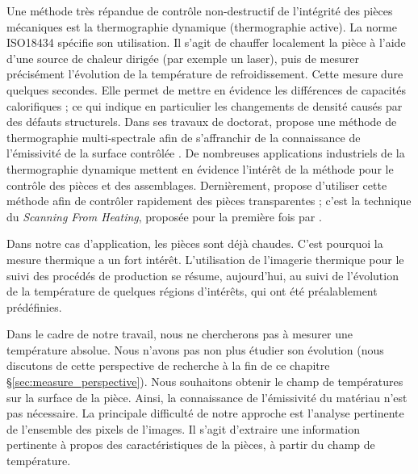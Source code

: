 Une méthode très répandue de contrôle non-destructif de l'intégrité des pièces mécaniques est la thermographie dynamique (thermographie active).
La norme ISO18434 \cite{iso_tc108_iso_2008} spécifie son utilisation.
Il s'agit de chauffer localement la pièce à l'aide d'une source de chaleur dirigée (par exemple un laser), puis de mesurer précisément l'évolution de la température de refroidissement.
Cette mesure dure quelques secondes.
Elle permet de mettre en évidence les différences de capacités calorifiques ; ce qui indique en particulier les changements de densité causés par des défauts structurels.
Dans ses travaux de doctorat, \citeauthor{legrand_thermographie_2002} propose une méthode de thermographie multi-spectrale afin de s'affranchir de la connaissance de l'émissivité de la surface contrôlée \cite{legrand_thermographie_2002}.
De nombreuses applications industriels de la thermographie dynamique mettent en évidence l'intérêt de la méthode pour le contrôle des pièces et des assemblages.
Dernièrement, \citeauthor{herrmann_cracks_2019} propose d'utiliser cette méthode afin de contrôler rapidement des pièces transparentes \cite{herrmann_cracks_2019} ; c'est la technique du \textit{Scanning From Heating}, proposée pour la première fois par \citeauthor{eren_scanning_2009} \cite{eren_scanning_2009} .

Dans notre cas d'application, les pièces sont déjà chaudes.
C'est pourquoi la mesure thermique a un fort intérêt.
L'utilisation de l'imagerie thermique pour le suivi des procédés de production se résume, aujourd'hui, au suivi de l'évolution de la température de quelques régions d'intérêts, qui ont été préalablement prédéfinies.

Dans le cadre de notre travail, nous ne chercherons pas à mesurer une température absolue.
Nous n'avons pas non plus étudier son évolution (nous discutons de cette perspective de recherche à la fin de ce chapitre §\ref{sec:measure_perspective}).
Nous souhaitons obtenir le champ de températures sur la surface de la pièce.
Ainsi, la connaissance de l'émissivité du matériau n'est pas nécessaire.
La principale difficulté de notre approche est l'analyse pertinente de l'ensemble des pixels de l'images.
Il s'agit d'extraire une information pertinente à propos des caractéristiques de la pièces, à partir du champ de température.

